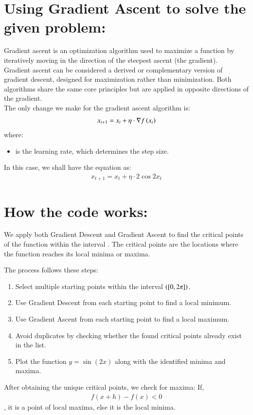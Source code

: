 \documentclass[journal]{IEEEtran}
\begin{document}
\section*{Using Gradient Ascent to solve the given problem:}
Gradient ascent is an optimization algorithm used to maximize a function by iteratively moving in the direction of the steepest ascent (the gradient). \\
Gradient ascent can be considered a derived or complementary version of gradient descent, designed for maximization rather than minimization. Both algorithms share the same core principles but are applied in opposite directions of the gradient.\\
The only change we make for the gradient ascent algorithm is:\\
\begin{align}
            x_{t+1} = x_t + \eta \cdot \nabla f\left(x_t\right)
\end{align}
 where:
        \begin{itemize}
            \item \brak{\eta} is the learning rate, which determines the step size.
        \end{itemize}
	In this case, we shall have the equation as:
	\begin{align}
		x_{t+1}=x_t + \eta \cdot 2\cos{2x_t}
	\end{align}
\section*{How the code works:}
We apply both Gradient Descent and Gradient Ascent to find the critical points of the function  within the interval \brak{[0, 2\pi]}. The critical points are the locations where the function reaches its local minima or maxima.

The process follows these steps:
\begin{enumerate}
    \item Select multiple starting points within the interval $\left( [0, 2\pi]\right).$
    \item Use Gradient Descent from each starting point to find a local minimum.
    \item Use Gradient Ascent from each starting point to find a local maximum.
    \item Avoid duplicates by checking whether the found critical points already exist in the list.
    \item Plot the function $y = \sin(2x) $ along with the identified minima and maxima.\\
\end{enumerate}
After obtaining the unique critical points, we check for maxima:
If, 
\begin{align}
f(x+h)-f(x)<0
\end{align}, it is a point of local maxima, else it is the local minima.
\end{document}
